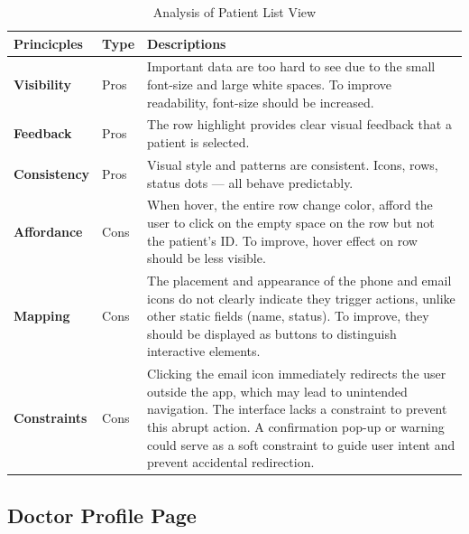 \documentclass[12pt, titlepage]{article}
\begin{document}
\begin{table}[h!]
    \centering
    \begin{tabular}{|p{2.5cm}|p{1.5cm}|p{11cm}|}
    \hline
    \rowcolor{gray!30}
    \textbf{Princicples} & \textbf{Type} & \textbf{Descriptions} \\
    \hline
    \textbf{Visibility} & Pros & Important data are too hard to see due to the small font-size and large white spaces. To improve readability, font-size should be increased.\\
    \hline
    \textbf{Feedback} & Pros & The row highlight provides clear visual feedback that a patient is selected.\\
    \hline
    \textbf{Consistency} & Pros & Visual style and patterns are consistent. Icons, rows, status dots — all behave predictably.\\
    \hline
    \textbf{Affordance} & Cons & When hover, the entire row change color, afford the user to click on the empty space on the row but not the patient's ID. To improve, hover effect on row should be less visible.\\
    \hline
    \textbf{Mapping} & Cons & The placement and appearance of the phone and email icons do not clearly indicate they trigger actions, unlike other static fields (name, status). To improve, they should be displayed as buttons to distinguish interactive elements. \\
    \hline
    \textbf{Constraints} & Cons & Clicking the email icon immediately redirects the user outside the app, which may lead to unintended navigation. The interface lacks a constraint to prevent this abrupt action. A confirmation pop-up or warning could serve as a soft constraint to guide user intent and prevent accidental redirection. \\

    \hline
    \end{tabular}
    \caption{Analysis of Patient List View}
\end{table}

\newpage
\subsection{Doctor Profile Page}
\end{document}
